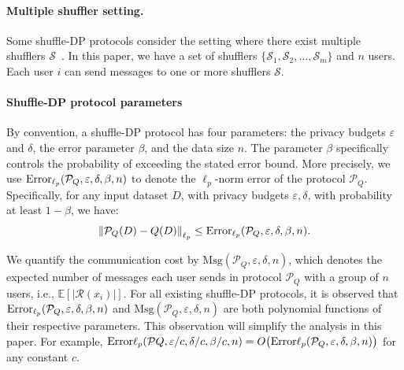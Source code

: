 \paragraph{Multiple shuffler setting.} 
Some shuffle-DP protocols consider the setting where there exist multiple shufflers $\mathcal{S}$~\cite{balle2020privatesum}.
In this paper, we have a set of shufflers $\{\mathcal{S}_1, \mathcal{S}_2, \ldots, \mathcal{S}_m\}$ and $n$ users. 
Each user $i$ can send messages to one or more shufflers $\mathcal{S}$. 


\paragraph{Shuffle-DP protocol parameters}
 By convention, a shuffle-DP protocol has four parameters: the privacy budgets $\varepsilon$ and $\delta$, the error parameter $\beta$, and the data size $n$. The parameter $\beta$ specifically controls the probability of exceeding the stated error bound. 
More precisely, we use $\mathrm{Error}_{\ell_p}(\mathcal{P}_Q, \varepsilon, \delta, \beta,n)$ to denote the $\ell_p$-norm error of the protocol $\mathcal{P}_Q$. Specifically, for any input dataset $D$, with privacy budgets $\varepsilon, \delta$, with probability at least $1 - \beta$, we have:
\[
\left\| \mathcal{P}_Q(D) - Q(D) \right\|_{\ell_p} \leq \mathrm{Error}_{\ell_p}(\mathcal{P}_Q, \varepsilon, \delta, \beta,n).
\]


We quantify the communication cost by $\mathrm{Msg}(\mathcal{P}_Q,\varepsilon,\delta,n)$, which denotes the expected number of messages each user sends in protocol $\mathcal{P}_Q$ with a group of $n$ users, i.e., $\mathbb{E}[|\mathcal{R}(x_i)|]$. 
For all existing shuffle-DP protocols, it is observed that $\mathrm{Error}_{\ell_p}(\mathcal{P}_Q, \varepsilon, \delta, \beta,n)$ and $\mathrm{Msg}(\mathcal{P}_Q, \varepsilon, \delta, n)$ are both polynomial functions of their respective parameters. 
This observation will simplify the analysis in this paper. For example, $\mathrm{Error}{\ell_p}(\mathcal{P}Q, \varepsilon/c, \delta/c, \beta/c,n) = O\big(\mathrm{Error}{\ell_p}(\mathcal{P}_Q, \varepsilon, \delta, \beta,n)\big)$ for any constant $c$.




